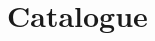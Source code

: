 \documentclass{article}
\author{Leopold Lemmermann}
\begin{document}
\createtitle

\section{Catalogue}




\end{document}
